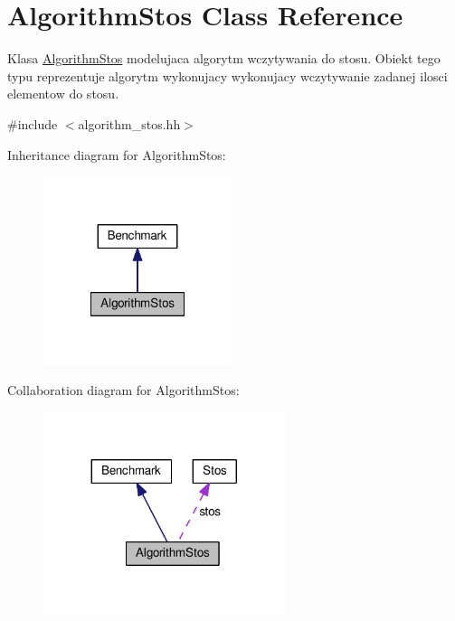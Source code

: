 \hypertarget{class_algorithm_stos}{}\section{Algorithm\+Stos Class Reference}
\label{class_algorithm_stos}


Klasa \hyperlink{class_algorithm_stos}{Algorithm\+Stos} modelujaca algorytm wczytywania do stosu. Obiekt tego typu reprezentuje algorytm wykonujacy wykonujacy wczytywanie zadanej ilosci elementow do stosu.  




{\ttfamily \#include $<$algorithm\+\_\+stos.\+hh$>$}



Inheritance diagram for Algorithm\+Stos\+:\nopagebreak
\begin{figure}[H]
\begin{center}
\leavevmode
\includegraphics[width=156pt]{class_algorithm_stos__inherit__graph}
\end{center}
\end{figure}


Collaboration diagram for Algorithm\+Stos\+:\nopagebreak
\begin{figure}[H]
\begin{center}
\leavevmode
\includegraphics[width=200pt]{class_algorithm_stos__coll__graph}
\end{center}
\end{figure}

